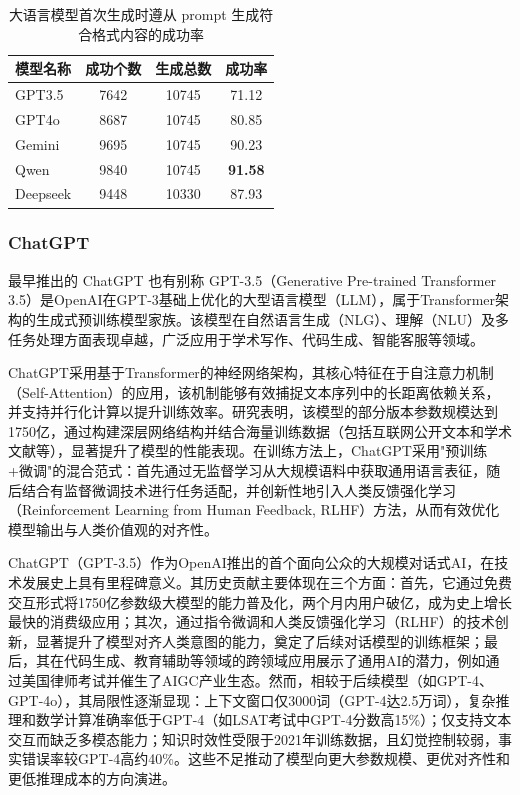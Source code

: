 \begin{table}[htbp]
    \centering
    \caption{大语言模型首次生成时遵从 prompt 生成符合格式内容的成功率}
    \begin{tabular}{l|ccc}
\toprule
\textbf{模型名称} & \textbf{成功个数} & \textbf{生成总数} & \textbf{成功率} \\
\midrule
GPT3.5   & 7642      & 10745   & 71.12 \\
GPT4o    & 8687      & 10745   & 80.85 \\
Gemini   & 9695      & 10745   & 90.23 \\
Qwen     & 9840      & 10745   & \textbf{91.58} \\
Deepseek & 9448      & 10330   & 87.93 \\
\bottomrule
    \end{tabular}
    \label{tab:construct-dataset-success-rate}
\end{table}

\subsubsection{ChatGPT}
\label{sec:TOSWT-gen-chatgpt}

最早推出的 ChatGPT \cite{chatgpt} 也有别称 GPT-3.5（Generative Pre-trained Transformer 3.5）是OpenAI在GPT-3基础上优化的大型语言模型（LLM），属于Transformer架构的生成式预训练模型家族。该模型在自然语言生成（NLG）、理解（NLU）及多任务处理方面表现卓越，广泛应用于学术写作、代码生成、智能客服等领域。

ChatGPT采用基于Transformer的神经网络架构，其核心特征在于自注意力机制（Self-Attention）的应用，该机制能够有效捕捉文本序列中的长距离依赖关系，并支持并行化计算以提升训练效率。研究表明，该模型的部分版本参数规模达到1750亿，通过构建深层网络结构并结合海量训练数据（包括互联网公开文本和学术文献等），显著提升了模型的性能表现。在训练方法上，ChatGPT采用"预训练+微调"的混合范式：首先通过无监督学习从大规模语料中获取通用语言表征，随后结合有监督微调技术进行任务适配，并创新性地引入人类反馈强化学习 \cite{kaufmann2024surveyreinforcementlearninghuman}（Reinforcement Learning from Human Feedback, RLHF）方法，从而有效优化模型输出与人类价值观的对齐性。

ChatGPT（GPT-3.5）作为OpenAI推出的首个面向公众的大规模对话式AI，在技术发展史上具有里程碑意义。其历史贡献主要体现在三个方面：首先，它通过免费交互形式将1750亿参数级大模型的能力普及化，两个月内用户破亿，成为史上增长最快的消费级应用；其次，通过指令微调和人类反馈强化学习（RLHF）的技术创新，显著提升了模型对齐人类意图的能力，奠定了后续对话模型的训练框架；最后，其在代码生成、教育辅助等领域的跨领域应用展示了通用AI的潜力，例如通过美国律师考试并催生了AIGC产业生态。然而，相较于后续模型（如GPT-4、GPT-4o），其局限性逐渐显现：上下文窗口仅3000词（GPT-4达2.5万词），复杂推理和数学计算准确率低于GPT-4（如LSAT考试中GPT-4分数高15\%）；仅支持文本交互而缺乏多模态能力；知识时效性受限于2021年训练数据，且幻觉控制较弱，事实错误率较GPT-4高约40\%。这些不足推动了模型向更大参数规模、更优对齐性和更低推理成本的方向演进。

